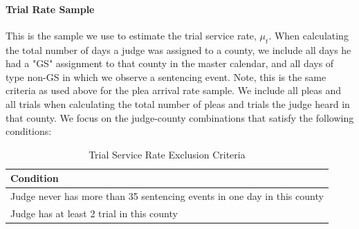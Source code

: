 \documentclass[11pt]{article}
\theoremstyle{ModifiedStyle}
\theoremstyle{ModifiedStyle}
\begin{document}
      \paragraph{Trial Rate Sample} This is the sample we use to estimate the trial service rate, $\mu_t$. When calculating the total number of days a judge was assigned to a county, we include all days he had a "GS" assignment to that county in the master calendar, and all days of type non-GS in which we observe a sentencing event. Note, this is the same criteria as used above for the plea arrival rate sample. We include all pleas and all trials when calculating the total number of pleas and trials the judge heard in that county. We focus on the judge-county combinations that satisfy the following conditions:

        \begin{table}[H]
        \centering
        \caption{Trial Service Rate Exclusion Criteria}
        \begin{tabular}{|l|}
        \hline
        \textbf{Condition}                                                       \\ \hline
        Judge never has more than 35 sentencing events in one day in this county \\
        Judge has at least 2 trial in this county                                \\ \hline
        \end{tabular}
        \end{table}

\end{document}
